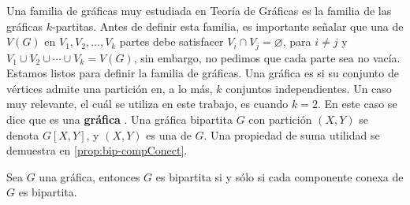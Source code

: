 Una familia de gr\'aficas muy estudiada en Teor\'ia de Gr\'aficas es la familia
de las gr\'aficas $k$-partitas. Antes de definir esta familia, es importante
se\~{n}alar que una  de
$V(G)$ en $V_1, V_2, \dots, V_k$ partes debe satisfacer $V_i \cap V_j =
\varnothing$, para $i \ne j$ y $V_1 \cup V_2 \cup \cdots \cup V_k = V(G)$, sin
embargo, no pedimos que cada parte sea no vac\'ia. Estamos listos para definir
la familia de gr\'aficas. Una gr\'afica es  si
su conjunto de v\'ertices admite una partici\'on en, a lo m\'as, $k$ conjuntos
independientes. Un caso muy relevante, el cu\'al se utiliza en este trabajo,
es cuando $k=2$. En este caso se dice que es una \textbf{gr\'afica}
. Una gr\'afica
bipartita $G$ con partici\'on $(X,Y)$ se denota $G[X,Y]$, y $(X,Y)$ es una
 de $G$. Una propiedad de suma utilidad se demuestra en
\cref{prop:bip-compConect}. 
\begin{proposicion}
\label{prop:bip-compConect}
    Sea $G$ una gr\'afica, entonces $G$ es bipartita si y s\'olo si cada
    componente conexa de $G$ es bipartita.
\end{proposicion}

